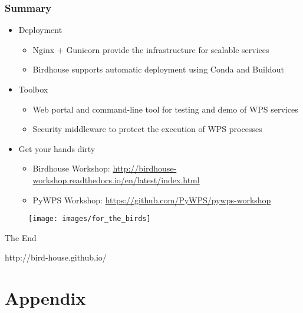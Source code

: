 \documentclass{beamer}
\begin{document}
\begin{frame}
\frametitle<presentation>{Summary}

\begin{itemize}

  \item Deployment
  \begin{itemize}
    \item Nginx + Gunicorn provide the infrastructure for scalable services
    \item Birdhouse supports automatic deployment using Conda and Buildout
  \end{itemize}

  \item{Toolbox}
  \begin{itemize}
    \item Web portal and command-line tool for testing and demo of WPS services
    \item Security middleware to protect the execution of WPS processes
  \end{itemize}

  \item{Get your hands dirty}
  \begin{itemize}
    \item Birdhouse Workshop: \url{http://birdhouse-workshop.readthedocs.io/en/latest/index.html}
    \item PyWPS Workshop: \url{https://github.com/PyWPS/pywps-workshop}
  \end{itemize}
\end{itemize}

\end{frame}

\begin{frame}

  \begin{figure}[ht]
   \centering
   \texttt{[image: images/for\_the\_birds]}
  \end{figure}

\centering
\Huge{The End}

\vspace{0.4cm}
\normalsize{http://bird-house.github.io/}
\end{frame}

\appendix

\section{Appendix}
\end{document}
